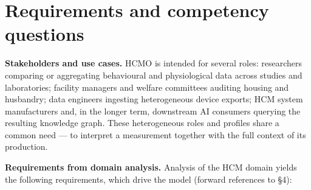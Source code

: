 \section{Requirements and competency questions}
\textbf{Stakeholders and use cases.} HCMO is intended for several roles: researchers comparing or aggregating behavioural and physiological data across studies and laboratories; facility managers and welfare committees auditing housing and husbandry; data engineers ingesting heterogeneous device exports; HCM system manufacturers and, in the longer term, downstream AI consumers querying the resulting knowledge graph. These heterogeneous roles and profiles share a common need --- to interpret a measurement together with the full context of its production.

\textbf{Requirements from domain analysis.} Analysis of the HCM domain \cite{kiryk2026,huzard2026tech,forrest2026} yields the following requirements, which drive the model (forward references to \S{}4):

